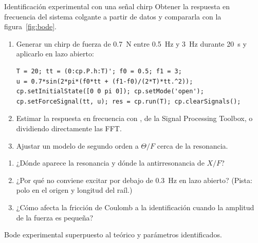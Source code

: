 \begin{practica}{Identificación experimental con una señal chirp}
\objetivos Obtener la respuesta en frecuencia del sistema colgante a partir de datos y compararla con la figura~\ref{fig:bode}.
\procedimiento
\begin{enumerate}
  \item Generar un chirp de fuerza de \SI{0.7}{N} entre \SI{0.5}{Hz} y \SI{3}{Hz} durante \SI{20}{s} y aplicarlo en lazo abierto:
\begin{lstlisting}
T = 20; tt = (0:cp.P.h:T)'; f0 = 0.5; f1 = 3;
u = 0.7*sin(2*pi*(f0*tt + (f1-f0)/(2*T)*tt.^2));
cp.setInitialState([0 0 pi 0]); cp.setMode('open');
cp.setForceSignal(tt, u); res = cp.run(T); cp.clearSignals();
\end{lstlisting}
  \item Estimar la respuesta en frecuencia con , de la Signal Processing Toolbox, o dividiendo directamente las FFT.
  \item Ajustar un modelo de segundo orden a $\Theta/F$ cerca de la resonancia.
\end{enumerate}
\preguntas
\begin{enumerate}
  \item ¿Dónde aparece la resonancia y dónde la antirresonancia de $X/F$?
  \item ¿Por qué no conviene excitar por debajo de \SI{0.3}{Hz} en lazo abierto? (Pista: polo en el origen y longitud del raíl.)
  \item ¿Cómo afecta la fricción de Coulomb a la identificación cuando la amplitud de la fuerza es pequeña?
\end{enumerate}
\entregables Bode experimental superpuesto al teórico y parámetros identificados.
\end{practica}

